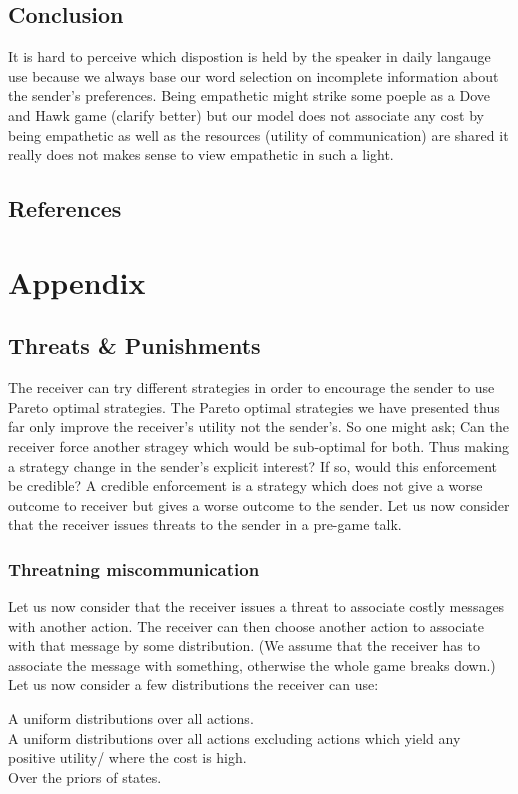 \documentclass[10]{article}
\begin{document}
\subsection{Conclusion}
It is hard to perceive which dispostion is held by the speaker in daily langauge use because we always base our word selection on incomplete information about the sender's preferences.
Being empathetic might strike some poeple as a Dove and Hawk game (clarify better) but our model does not associate any cost by being empathetic as well as the resources (utility of communication) are shared it really does not makes sense to view empathetic in such a light.
\subsection{References}

\section{Appendix}
\subsection{Threats \& Punishments}
The receiver can try different strategies in order to encourage the sender to use Pareto optimal strategies. The Pareto optimal strategies we have presented thus far only improve the receiver's utility not the sender's. So one might ask; Can the receiver force another stragey which would be sub-optimal for both. Thus making a strategy change in the sender's explicit interest? If so, would this enforcement be credible? A credible enforcement is a strategy which does not give a worse outcome to receiver but gives a worse outcome to the sender. Let us now consider that the receiver issues threats to the sender in a pre-game talk. %
\subsubsection{Threatning miscommunication}
Let us now consider that the receiver issues a threat to associate costly messages with another action. The receiver can then choose another action to associate with that message by some distribution. (We assume that the receiver has to associate the message with something, otherwise the whole game breaks down.) Let us now consider a few distributions the receiver can use:

A uniform distributions over all actions. \\
A uniform distributions over all actions excluding actions which yield any positive utility/ where the cost is high. \\%
Over the priors of states. \\
\end{document}
